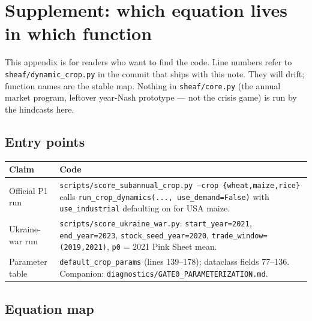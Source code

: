 \section{Supplement: which equation lives in which function}
\label{sec:code}

This appendix is for readers who want to find the code. Line numbers refer
to \texttt{sheaf/dynamic\_crop.py} in the commit that ships with this note.
They will drift; function names are the stable map. Nothing in
\texttt{sheaf/core.py} (the annual market program, leftover year-Nash
prototype --- not the crisis game) is run by the hindcasts here.

\subsection{Entry points}

\begin{center}
\small
\begin{tabular}{p{}p{}}
\toprule
Claim & Code \\
\midrule
Official P1 run &
\texttt{scripts/score\_subannual\_crop.py --crop \{wheat,maize,rice\}}
calls \texttt{run\_crop\_dynamics(..., use\_demand=False)} with
\texttt{use\_industrial} defaulting on for USA maize. \\
Ukraine-war run &
\texttt{scripts/score\_ukraine\_war.py}:
\texttt{start\_year=2021}, \texttt{end\_year=2023},
\texttt{stock\_seed\_year=2020}, \texttt{trade\_window=(2019,2021)},
\texttt{p0} = 2021 Pink Sheet mean. \\
Parameter table &
\texttt{default\_crop\_params} (lines 139--178);
dataclass fields 77--136. Companion:
\texttt{diagnostics/GATE0\_PARAMETERIZATION.md}. \\
\bottomrule
\end{tabular}
\end{center}

\subsection{Equation map}

